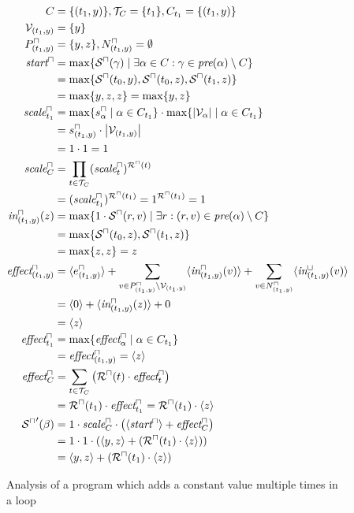 \begin{figure}
\begin{align*}
  C &= \lbrace (t_1,y) \rbrace, \mathcal{T}_C = \lbrace t_1 \rbrace, C_{t_1} = \lbrace (t_1,y) \rbrace \\
  \mathcal{V}_{(t_1,y)} &= \lbrace y \rbrace \\
  P^\sqcap_{(t_1,y)} &= \lbrace y,z \rbrace, N^\sqcap_{(t_1,y)} = \emptyset \\
  \emph{start}^\sqcap &= \max \lbrace {\mathcal{S}^\sqcap}(\gamma) \mid \exists \alpha \in C: \gamma \in \emph{pre}(\alpha) \setminus C \rbrace \\
  &= \max \lbrace {\mathcal{S}^\sqcap}(t_0,y), {\mathcal{S}^\sqcap}(t_0,z), {\mathcal{S}^\sqcap}(t_1,z) \rbrace \\
  &= \max \lbrace y,z,z \rbrace = \max \lbrace y,z \rbrace \\
  \emph{scale}^\sqcap_{t_1} &= \max \lbrace s^\sqcap_\alpha \mid \alpha \in C_{t_1} \rbrace \cdot \max \lbrace \left|\mathcal{V}_\alpha\right| \mid \alpha \in C_{t_1} \rbrace \\
  &= s^\sqcap_{(t_1,y)} \cdot \left|\mathcal{V}_{(t_1,y)}\right| \\
  &= 1 \cdot 1 = 1 \\
  \emph{scale}^\sqcap_C &= \prod_{t \in \mathcal{T}_C} (\emph{scale}^\sqcap_t)^{{\mathcal{R}^\sqcap}(t)} \\
  &= (\emph{scale}^\sqcap_{t_1})^{{\mathcal{R}^\sqcap}(t_1)} = 1^{{\mathcal{R}^\sqcap}(t_1)} = 1 \\
  \emph{in}^\sqcap_{(t_1,y)}(z) &= \max \lbrace 1 \cdot {\mathcal{S}^\sqcap}(r, v) \mid \exists r: (r, v) \in \emph{pre}(\alpha) \setminus C \rbrace \\
  &= \max \lbrace {\mathcal{S}^\sqcap}(t_0, z), {\mathcal{S}^\sqcap}(t_1, z) \rbrace \\
  &= \max \lbrace z,z \rbrace = z \\
  \emph{effect}^\sqcap_{(t_1,y)} &= \langle e^{\sqcap}_{(t_1,y)}\rangle + \sum_{v \in P_{(t_1,y)}^\sqcap \setminus \mathcal{V}_{(t_1,y)}} \langle\emph{in}^\sqcap_{(t_1,y)}(v)\rangle + \sum_{v \in N_{(t_1,y)}^\sqcap} \langle\emph{in}^\sqcup_{(t_1,y)}(v)\rangle \\
  &= \langle0\rangle + \langle\emph{in}^\sqcap_{(t_1,y)}(z)\rangle + 0 \\
  &= \langle z\rangle \\
  \emph{effect}^\sqcap_{t_1} &= \max \lbrace \emph{effect}^\sqcap_\alpha \mid \alpha \in C_{t_1}  \rbrace \\
  &= \emph{effect}^\sqcap_{(t_1,y)} = \langle z\rangle \\
  \emph{effect}^\sqcap_C &= \sum_{t \in \mathcal{T}_C} \left( {\mathcal{R}^\sqcap}(t) \cdot \emph{effect}^\sqcap_t \right) \\
  &= {\mathcal{R}^\sqcap}(t_1) \cdot \emph{effect}^\sqcap_{t_1} = {\mathcal{R}^\sqcap}(t_1) \cdot \langle z\rangle \\
  {\mathcal{S}^\sqcap}'(\beta) &= 1 \cdot \emph{scale}^\sqcap_C \cdot \left( \langle\emph{start}^\sqcap\rangle + \emph{effect}^\sqcap_C \right) \\
  &= 1 \cdot 1 \cdot \left( \langle y,z\rangle + ({\mathcal{R}^\sqcap}(t_1) \cdot \langle z\rangle) \right) \\
  &= \langle y,z\rangle + ({\mathcal{R}^\sqcap}(t_1) \cdot \langle z\rangle)
\end{align*}

\caption{Analysis of a program which adds a constant value multiple times in a loop}
\label{fig:additive_loop}
\end{figure}

